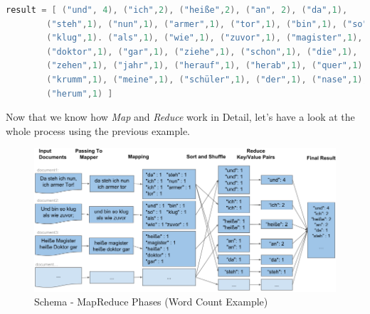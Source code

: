 {\begin{lstlisting}[aboveskip=1ex, belowskip=3ex, xleftmargin=18pt, emphstyle=\underbar, breaklines=true, showstringspaces=false, captionpos=b, caption=MR Example - \textit{Word Count (Final Result)}, label=min_mapreduce_documents,language=java]
result = [ ("und", 4), ("ich",2), ("heiße",2), ("an", 2), ("da",1), 
		("steh",1), ("nun",1), ("armer",1), ("tor",1), ("bin",1), ("so",1), 
		("klug",1). ("als",1), ("wie",1), ("zuvor",1), ("magister",1), 
		("doktor",1), ("gar",1), ("ziehe",1), ("schon",1), ("die",1), 
		("zehen",1), ("jahr",1), ("herauf",1), ("herab",1), ("quer",1), 
		("krumm",1), ("meine",1), ("schüler",1), ("der",1), ("nase",1), 
		("herum",1) ]
\end{lstlisting}

Now that we know how \textit{Map} and \textit{Reduce} work in Detail, let's have a look at the whole process using the previous example. 

\begin{figure}[ht]
	\centering
  \includegraphics[width=1\textwidth]{map_reduce_phases_schema.png}
	\caption{Schema - MapReduce Phases (Word Count Example)}
	\label{schema_map_reduce_phases_wordcount}
\end{figure}

}
